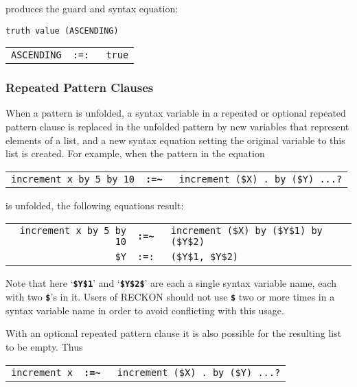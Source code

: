 \documentclass[12pt]{article}
\newcommand{\TT}[1]{{\tt \bfseries #1}}
\begin{document}
produces the guard and syntax equation:

\begin{center}
\verb/truth value (ASCENDING)/ \\
\begin{tabular}{rcl}
\verb/ASCENDING/ & \tt :=: & \verb/true/ \\
\end{tabular}
\end{center}



\subsubsection{Repeated Pattern Clauses}
\label{REPEATED-PATTERN-CLAUSES}

When a pattern is unfolded, a syntax variable in a
repeated or optional repeated pattern clause is replaced
in the unfolded pattern by new variables that represent elements of a list,
and a new syntax equation setting the original variable to this list
is created.  For example, when the pattern in the equation

\begin{center}
\begin{tabular}{rcl}
\verb/increment x by 5 by 10/ & \TT{:=\~~}
			      & \verb/increment ($X) . by ($Y) ...?/ \\
\end{tabular}
\end{center}

is unfolded, the following equations result:

\begin{center}
\begin{tabular}{rcl}
\verb/increment x by 5 by 10/ & \TT{:=\~~}
			      & \verb/increment ($X) by ($Y$1) by ($Y$2)/ \\
\verb/$Y/ & \tt :=: & \verb|($Y$1, $Y$2)|
\end{tabular}
\end{center}

Note that here `\TT{\$Y\$1}' and `\TT{\$Y\$2\$}' are each a single syntax
variable name, each with two \TT{\$}'s in it.  Users of RECKON should
not use \TT{\$} two or more times in
a syntax variable name in order to avoid conflicting
with this usage.

With an optional repeated pattern clause it is also possible for the
resulting list to be empty.  Thus

\begin{center}
\begin{tabular}{rcl}
\verb/increment x/ & \TT{:=\~~}
			      & \verb/increment ($X) . by ($Y) ...?/ \\
\end{tabular}
\end{center}
\end{document}
